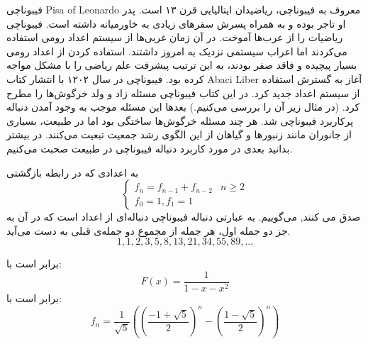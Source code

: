 \begin{EXTRA}{ فیبوناچی }
\p
{}
Pisa
of 
Leonardo
معروف به
فیبوناچی، ریاضیدان ایتالیایی قرن 
۱۳
است.
پدر او تاجر بوده و به همراه پسرش سفرهای زیادی به خاورمیانه داشته است.
فیبوناچی ریاضیات را از عرب‌ها آموخت.
در آن زمان غربی‌ها از سیستم اعداد رومی استفاده می‌کردند اما اعراب سیستمی نزدیک به امروز داشتند.
استفاده کردن از اعداد رومی بسیار پیچیده‌ و فاقد صفر بودند، به این ترتیب پیشرفت علم ریاضی را با مشکل مواجه کرده بود.
فیبوناچی در سال ۱۲۰۲ با انتشار کتاب
Abaci
Liber
آغاز به
گسترش استفاده از سیستم اعداد جدید کرد.
در این کتاب فیبوناچی مسئله زاد و ولد خرگوش‌ها را مطرح کرد. (در مثال زیر آن را بررسی می‌کنیم.)
بعدها این مسئله موجب به وجود آمدن دنباله پرکاربرد فیبوناچی شد.
هر چند مسئله خرگوش‌ها ساختگی بود اما در طبیعت، بسیاری از جانوران مانند زنبورها و گیاهان از این الگوی رشد جمعیت تبعیت می‌کنند.
در بیشتر بدانید بعدی در مورد کاربرد دنباله فیبوناچی در طبیعت صحبت می‌کنیم.
\end{EXTRA}



    
\begin{DEFINITION}
    به اعدادی که در رابطه بازگشتی
  \[\begin{cases}
      f_{n}=f_{n-1} + f_{n-2} & n\geq 2 \\
      
      f_0=1 ,
      f_1 = 1
  \end{cases}
  \]
  صدق می کنند,
    می‌گوییم.
    به عبارتی دنباله فیبوناچی
    دنباله‌ای از اعداد است که در آن به جز دو جمله اول، هر جمله از مجموع دو جمله‌ی قبلی به دست می‌آید.
    \p
  $$1, 1, 2, 3, 5, 8, 13, 21, 34, 55, 89, ...$$
\end{DEFINITION}




\begin{THEOREM}
    \p
    برابر است با:
    $$F(x) = \frac{1}{1 - x - x^2}$$
    برابر است با:
    $$f_n = \frac{1}{\sqrt{5}}((\frac{-1 + \sqrt{5}}{2})^{n} - (\frac{1 - \sqrt{5}}{2})^{n})$$
\end{THEOREM}

